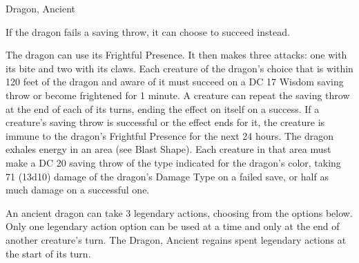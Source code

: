 \begin{DndMonster}[float*=b,width=\textwidth + 8pt]{Dragon, Ancient}
\begin{multicols}{2}
 If the dragon fails a saving throw, it can choose to succeed instead.

 The dragon can use its Frightful Presence. It then makes three attacks: one with its bite and two with its claws.
\DndMonsterAttack[
	name=Bite,
	distance=melee,
	type=weapon,
	mod=+13,
	reach=15,
	dmg=\DndDice{2d10 + 8},
	dmg-type=piercing,
	extra={ plus 9 (2d8) damage of the dragon's Damage Type.}
]
\DndMonsterAttack[
	name=Claw,
	distance=melee,
	type=weapon,
	mod=+13,
	reach=10,
	dmg=\DndDice{2d6 + 8},
	dmg-type=slashing
]
\DndMonsterAttack[
	name=Tail,
	distance=melee,
	type=weapon,
	mod=+13,
	reach=20,
	dmg=\DndDice{2d8 + 8},
	dmg-type=bludgeoning
]
Each creature of the dragon's choice that is within 120 feet of the dragon and aware of it must succeed on a DC 17 Wisdom saving throw or become frightened for 1 minute. A creature can repeat the saving throw at the end of each of its turns, ending the effect on itself on a success. If a creature's saving throw is successful or the effect ends for it, the creature is immune to the dragon's Frightful Presence for the next 24 hours.
The dragon exhales energy in an area (see Blast Shape). Each creature in that area must make a DC 20 saving throw of the type indicated for the dragon's color, taking 71 (13d10) damage of the dragon's Damage Type on a failed save, or half as much damage on a successful one.

An ancient dragon can take 3 legendary actions, choosing from the options below. Only one legendary action option can be used at a time and only at the end of another creature's turn. The Dragon, Ancient regains spent legendary actions at the start of its turn.
\begin{DndMonsterLegendaryActions}
\end{DndMonsterLegendaryActions}
\end{multicols}
\end{DndMonster}

